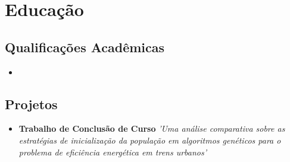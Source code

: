 \documentclass[11pt,a4paper,sans]{moderncv}        %
\begin{document}
\section{Educação}

\vspace{5pt}

\subsection{Qualificações Acadêmicas}

\vspace{5pt}

\begin{itemize}

\item{}  %

\end{itemize}

\vspace{2pt}

\subsection{Projetos}

\vspace{5pt}

\begin{itemize}

\item{\textbf{Trabalho de Conclusão de Curso} \textit{'Uma análise comparativa sobre as estratégias de inicialização da população em algoritmos genéticos para o problema de eficiência energética em trens urbanos'}}

\vspace{3pt}






\end{itemize}

\vspace{2pt}
\end{document}
